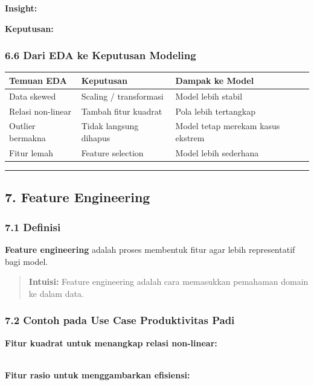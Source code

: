 \documentclass[12pt,a4paper]{article}
\begin{document}
\textbf{Insight:}


\textbf{Keputusan:}


\subsubsection{6.6 Dari EDA ke Keputusan Modeling}

\begin{tabular}{|l|l|l|}
\hline
Temuan EDA & Keputusan & Dampak ke Model \\
\hline
Data skewed & Scaling / transformasi & Model lebih stabil \\
\hline
Relasi non-linear & Tambah fitur kuadrat & Pola lebih tertangkap \\
\hline
Outlier bermakna & Tidak langsung dihapus & Model tetap merekam kasus ekstrem \\
\hline
Fitur lemah & Feature selection & Model lebih sederhana \\
\hline
\end{tabular}


\hrule


\subsection{7. Feature Engineering}

\subsubsection{7.1 Definisi}

\textbf{Feature engineering} adalah proses membentuk fitur agar lebih representatif bagi model.


\begin{quote}
\textbf{Intuisi:} Feature engineering adalah cara memasukkan pemahaman domain ke dalam data.\end{quote}


\subsubsection{7.2 Contoh pada Use Case Produktivitas Padi}

\textbf{Fitur kuadrat untuk menangkap relasi non-linear:}


\\[
\text{rainfall}^2
\\]


\textbf{Fitur rasio untuk menggambarkan efisiensi:}


\\[
\text{fertilizer per area} = \frac{\text{fertilizer}}{\text{land area}}
\\]
\end{document}
